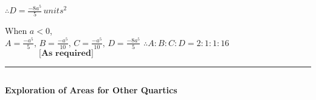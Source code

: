 \documentclass{homework}
\begin{document}
\begin{flushleft}
\begin{paracol}{2}
    $\therefore D=\frac{-8a^5}{5} \, units^2$ \vspace{1em}
    \end{paracol}
    When $a<0$, \vspace{0.5em}\\
    $A=\frac{-a^5}{5},\, B=\frac{-a^5}{10},\, C=\frac{-a^5}{10},\, D=\frac{-8a^5}{5}$\hspace{4em} $\therefore A:B:C:D=2:1:1:16 $
    $\hspace{4em} \textbf{[As required]}$ \vspace{1em} \\
    \rule{45em}{0.2pt}   $    $  \vspace{2.7em} \\
\end{flushleft}
\begin{center}
    \textbf{\large{Exploration of Areas for Other Quartics}} \vspace{0.8em}\\
\end{center}
\end{document}
